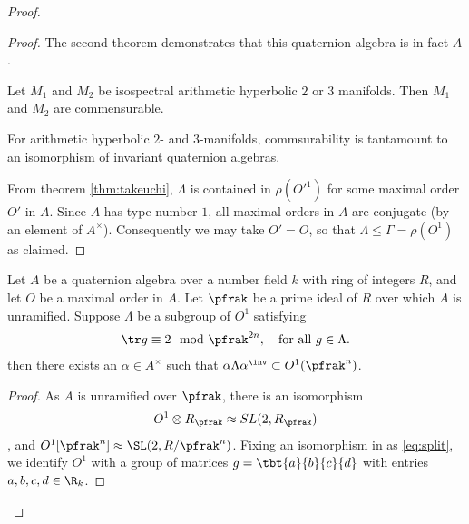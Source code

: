 \begin{proof}
\begin{proof}
    The second theorem demonstrates that this quaternion algebra is in fact $A$.
    \begin{thm}

      Let $M_1$ and $M_2$ be isospectral arithmetic hyperbolic $2$ or $3$ manifolds. Then $M_1$ and $M_2$ are commensurable.
    \end{thm}
    For arithmetic hyperbolic $2$- and $3$-manifolds, commsurability is tantamount to an isomorphism of invariant quaternion algebras.

    From theorem \ref{thm:takeuchi}, $\Lambda$ is contained in $\rho(O'^1)$ for some maximal order $O'$ in $A$. Since $A$ has type number $1$, all maximal orders in $A$ are conjugate (by an element of $A^\times$). Consequently we may take $O'=O$, so that $\Lambda \leq \Gamma = \rho(O^1)$ as claimed.


  \end{proof}
  \begin{lemma}\label{lemma:MangosteenPicosdeEuropa}
    Let $A$ be a quaternion algebra over a number field $k$ with ring of integers $R$, and let $O$ be a maximal order in $A$.
    Let $\pfrak$ be a prime ideal of $R$ over which $A$ is unramified.
    Suppose $\Lambda$ be a subgroup of $O^1$ satisfying
    \begin{align}\label{eq:trace}
      \tr g \equiv 2 \mod \pfrak^{2n}, \quad \text{for all $g \in \Lambda$}.
    \end{align}
    then there exists an $\alpha \in A^\times$ such that $\alpha \Lambda \alpha^\inv \subset O^1(\pfrak^n)$.
  \end{lemma}
  \begin{proof}


    As $A$ is unramified over $\pfrak$, there is an isomorphism
    \begin{align}\label{eq:split}
      O^1 \otimes R_\pfrak \approx SL(2,R_\pfrak)
    \end{align}, and $O^1[\pfrak^n] \approx \SL(2,R/\pfrak^n)$. Fixing an isomorphism in as \ref{eq:split}, we identify $O^1$ with a group of matrices $g = \tbt{a}{b}{c}{d}$ with entries $a,b,c,d \in \R_k$.


\end{proof}
\end{proof}
